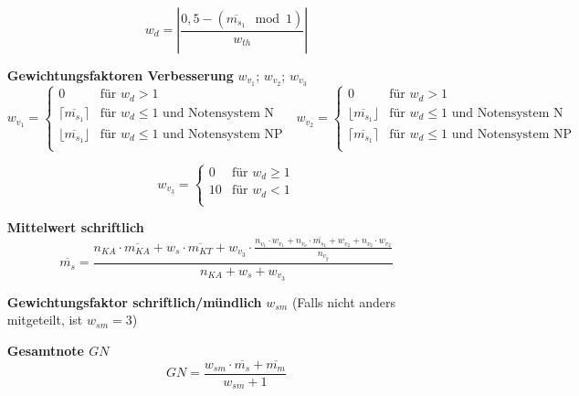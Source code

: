 \documentclass{article}
\begin{document}
\begin{enumerate}[label=\textbf{\textbullet}, align=left, leftmargin=*]
	\[
	w_{d} = \left| \frac{0{,}5 - (\overline{m_{s_1}} \mod 1)}{w_{th}} \right|
	\]
	\item[\textbf{Gewichtungsfaktoren Verbesserung}] $w_{v_1}$; $w_{v_2}$; $w_{v_3}$\cite{wikigaussklammer} \\
	\[
	w_{v_1} =
	\begin{cases}
		0 & \text{für }  w_{d} > 1 \\
		\lceil \overline{m_{s_1}} \rceil & \text{für }    w_{d} \leq 1 \text{ und Notensystem N} \\
		\lfloor \overline{m_{s_1}} \rfloor & \text{für }    w_{d} \leq 1 \text{ und Notensystem NP} \\
	\end{cases}
	\,\,\,\,
	w_{v_2} =
	\begin{cases}
		0 & \text{für }  w_{d} > 1 \\
		\lfloor \overline{m_{s_1}} \rfloor & \text{für }    w_{d} \leq 1 \text{ und Notensystem N} \\
		\lceil \overline{m_{s_1}} \rceil & \text{für }    w_{d} \leq 1 \text{ und Notensystem NP} \\
	\end{cases}
	\]
	
	\[
	w_{v_3} =
	\begin{cases}
		0 & \text{für }  w_{d} \geq 1 \\
		10 & \text{für }    w_{d} < 1 \\
	\end{cases}
	\]	
	\item[\textbf{Mittelwert schriftlich}]
	\[
	\overline{m_{s}} = \frac{ n_{KA} \cdot \overline{m_{KA}} + w_s \cdot \overline{m_{KT}} +w_{v_3} \cdot  \frac{n_{v_1} \cdot w_{v_1} + n_{v_o} \cdot \overline{m_{s_1}} + w_{v_2} + n_{v_2} \cdot w_{v_2}}{n_{v_g}}  }{n_{KA} + w_s + w_{v_3}}
	\]
	\item[\textbf{Gewichtungsfaktor schriftlich/mündlich}] $w_{sm}$ (Falls nicht anders mitgeteilt, ist $w_{sm}=3$)
	\item[\textbf{Gesamtnote $GN$}]
	\[
	GN = \frac{w_{sm} \cdot \overline{m_{s}} + \overline{m_{m}}}{w_{sm}+1}
	\]
\end{enumerate}

\renewcommand\refname{\normalsize Quellen}
\renewcommand{\bibname}{Quellen}

\vfill

\begingroup
\scriptsize


\endgroup
	
\end{document}
